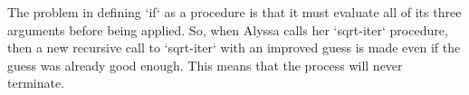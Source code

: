 The problem in defining `if` as a procedure is that it must evaluate all of its three arguments before being applied.
So, when Alyssa calls her `sqrt-iter` procedure, then a new recursive call to `sqrt-iter` with an improved guess is made even if the guess was already good enough.  This means that the process will never terminate.
